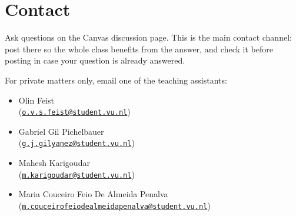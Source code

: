 \documentclass[11pt]{article}
\begin{document}
\section{Contact}
Ask questions on the Canvas discussion page. This is the main contact channel: post
there so the whole class benefits from the answer, and check it before posting in case
your question is already answered.

For private matters only, email one of the teaching assistants:
\begin{itemize}
  \item Olin Feist\\
        (\href{mailto:o.v.s.feist@student.vu.nl}{\texttt{o.v.s.feist@student.vu.nl}})
  \item Gabriel Gil Pichelbauer\\
        (\href{mailto:g.j.gilyanez@student.vu.nl}{\texttt{g.j.gilyanez@student.vu.nl}})
  \item Mahesh Karigoudar\\
        (\href{mailto:m.karigoudar@student.vu.nl}{\texttt{m.karigoudar@student.vu.nl}})
  \item Maria Couceiro Feio De Almeida Penalva\\
        (\href{mailto:m.couceirofeiodealmeidapenalva@student.vu.nl}%
        {\texttt{m.couceirofeiodealmeidapenalva@student.vu.nl}})
\end{itemize}
\end{document}
